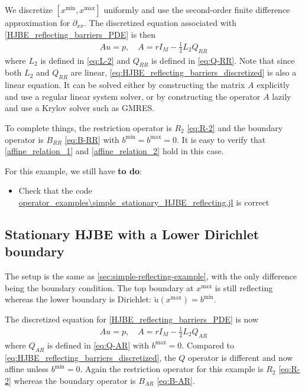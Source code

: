 \documentclass[11pt]{article}
\newcommand{\D}[1][]{\ensuremath{\partial_{#1}}}
\begin{document}
We discretize $[x^{\min},x^{\max}]$ uniformly and use the second-order finite difference approximation for $\D[xx]$. The discretized equation associated with \cref{HJBE_reflecting_barriers_PDE} is then
\begin{align}
	Au = p,\quad A = rI_M - \frac{1}{2}L_2Q_{RR}\label{eq:HJBE_reflecting_barriers_discretized}
\end{align}
where $L_2$ is defined in \cref{eq:L-2} and $Q_{RR}$ is defined in \cref{eq:Q-RR}. Note that since both $L_2$ and $Q_{RR}$ are linear, \cref{eq:HJBE_reflecting_barriers_discretized} is also a linear equation. It can be solved either by constructing the matrix $A$ explicitly and use a regular linear system solver, or by constructing the operator $A$ lazily and use a Krylov solver such as GMRES.

To complete things, the restriction operator is $R_2$ \cref{eq:R-2} and the boundary operator is $B_{RR}$ \cref{eq:B-RR} with $b^{\min} = b^{\max} = 0$. It is easy to verify that \cref{affine_relation_1} and \cref{affine_relation_2} hold in this case.

For this example, we still have \textbf{to do}:
\begin{itemize}
	\item Check that the code \url{operator_examples\simple_stationary_HJBE_reflecting.jl} is correct
\end{itemize}

\subsection{Stationary HJBE with a Lower Dirichlet boundary}
The setup is the same as \ref{sec:simple-reflecting-example}, with the only difference being the boundary condition. The top boundary at $x^{\max}$ is still reflecting whereas the lower boundary is Dirichlet: $\tilde{u}(x^{\max}) = b^{\min}$.

The discretized equation for \cref{HJBE_reflecting_barriers_PDE} is now
\begin{align}
	Au = p,\quad A = rI_M - \frac{1}{2}L_2Q_{AR}\label{eq:HJBE_lower_Dirichlet_discretized}
\end{align}
where $Q_{AR}$ is defined in \cref{eq:Q-AR} with $b^{\max} = 0$. Compared to \cref{eq:HJBE_reflecting_barriers_discretized}, the $Q$ operator is different and now affine unless $b^{\min} = 0$. Again the restriction operator for this example is $R_2$ \cref{eq:R-2} whereas the boundary operator is $B_{AR}$ \cref{eq:B-AR}.
\end{document}
